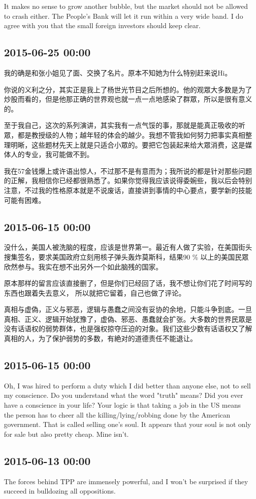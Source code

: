 \documentclass[twocolumn]{ctexart}
\begin{document}
It makes no sense to grow another bubble, but the market should not be allowed to crash either. The People's Bank will let it run within a very wide band. I do agree with you that the small foreign investors should keep clear.
\subsection*{2015-06-25 00:00}
我的确是和张小姐见了面、交换了名片。原本不知她为什么特别赶来说Hi。

你说的义利之分，其实正是我上了杨世光节目之后所想的。他的观眾大多数是为了炒股而看的，但是他那正确的世界观也就一点一点地感染了群眾，所以是很有意义的。

至于我自己，这次的系列演讲，其实我有一点气馁的事，那就是能真正吸收的听眾，都是教授级的人物；越年轻的体会的越少。我想不管我如何努力把事实真相整理明晰，这些题材先天上就是只适合小眾的。要把它包装起来给大眾消费，这是媒体人的专业，我可能做不到。

我在57金钱爆上或许语出惊人，不过那不是有意而为；我所说的都是针对那些问题的正解，我相信你已经都很熟悉了。如果你觉得我应该说得委婉些，我以后会特别注意，不过我的性格原本就是不说废话，直接讲到事情的中心要点，要学新的技能可能有困难。\subsection*{2015-06-15 00:00}
没什么，美国人被洗脑的程度，应该是世界第一。最近有人做了实验，在美国街头搜集签名，要求美国政府立刻用核子弹头轰炸莫斯科，结果90 \% 以上的美国民眾欣然参与。我实在想不出另外一个如此脑残的国家。

原本那样的留言应该直接删了，但是你们已经回了话，我不想让你们花了时间写的东西也跟着失去意义， 所以就把它留着，自己也做了评论。

真相与虚偽，正义与邪恶，逻辑与愚蠢之间没有妥协的余地，只能斗争到底。一旦真相、正义、逻辑开始犹豫了，虚偽、邪恶、愚蠢就会扩张。大多数的世界民眾是没有话语权的弱势群体，也是强权掠夺压迫的对象。我们这些少数有话语权又了解真相的人，为了保护弱势的多数，有絶对的道德责任不能退让。\subsection*{2015-06-15 00:00}
Oh, I was hired to perform a duty which I did better than anyone else, not to sell my conscience. Do you understand what the word "truth" means? Did you ever have a conscience in your life? Your logic is that taking a job in the US means the person has to cheer all the killing/lying/robbing done by the American government. That is called selling one's soul. It appears that your soul is not only for sale but also pretty cheap. Mine isn't.\subsection*{2015-06-13 00:00}
The forces behind TPP are immensely powerful, and I won't be surprised if they succeed in bulldozing all oppositions.
\end{document}
